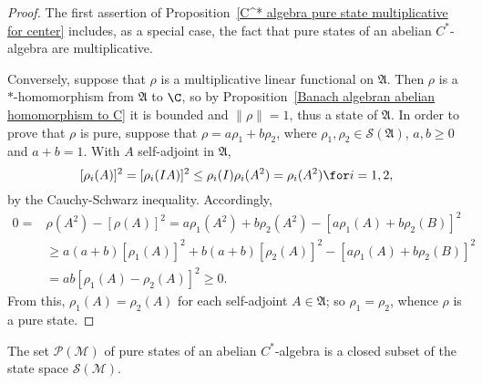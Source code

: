 \begin{proof}
The first assertion of Proposition~\ref{C^* algebra pure state multiplicative for center} includes, as a special case, the fact that pure states of an abelian $C^*$-algebra are multiplicative.\par
Conversely, suppose that $\rho$ is a multiplicative linear functional on $\mathfrak{A}$. Then $\rho$ is a $*$-homomorphism from $\mathfrak{A}$ to $\C$, so by Proposition~\ref{Banach algebran abelian homomorphism to C} it is bounded and $\|\rho\|=1$, thus a state of $\mathfrak{A}$. In order to prove that $\rho$ is pure, suppose that $\rho=a\rho_1+b\rho_2$, where $\rho_1,\rho_2\in\mathcal{S}(\mathfrak{A})$, $a,b\geq 0$ and $a+b=1$. With $A$ self-adjoint in $\mathfrak{A}$,
\[[\rho_i(A)]^2=[\rho_i(IA)]^2\leq\rho_i(I)\rho_i(A^2)=\rho_i(A^2)\for i=1,2,\]
by the Cauchy-Schwarz inequality. Accordingly,
\begin{align*}
0=&\rho(A^2)-[\rho(A)]^2=a\rho_1(A^2)+b\rho_2(A^2)-[a\rho_1(A)+b\rho_2(B)]^2\\
&\geq a(a+b)[\rho_1(A)]^2+b(a+b)[\rho_2(A)]^2-[a\rho_1(A)+b\rho_2(B)]^2\\
&=ab[\rho_1(A)-\rho_2(A)]^2\geq 0.
\end{align*}
From this, $\rho_1(A)=\rho_2(A)$ for each self-adjoint $A\in\mathfrak{A}$; so $\rho_1=\rho_2$, whence $\rho$ is a pure state.
\end{proof}
\begin{corollary}
The set $\mathcal{P}(\mathscr{M})$ of pure states of an abelian $C^*$-algebra is a closed subset of the state space $\mathcal{S}(\mathscr{M})$.
\end{corollary}
